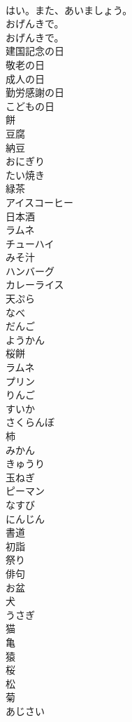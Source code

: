\documentclass[8pt]{extreport}
\begin{document}
\begin{CJK}{UTF8}{min}
\\	はい。また、あいましょう。 
\\	おげんきで。	
\\	おげんきで。 
\\	建国記念の日
\\	敬老の日
\\	成人の日
\\	勤労感謝の日
\\	こどもの日
\\	餅
\\	豆腐
\\	納豆
\\	おにぎり
\\	たい焼き
\\	緑茶
\\	アイスコーヒー
\\	日本酒
\\	ラムネ
\\	チューハイ
\\	みそ汁
\\	ハンバーグ
\\	カレーライス
\\	天ぷら
\\	なべ
\\	だんご
\\	ようかん
\\	桜餅
\\	ラムネ
\\	プリン
\\	りんご
\\	すいか
\\	さくらんぼ
\\	柿
\\	みかん
\\	きゅうり
\\	玉ねぎ
\\	ピーマン
\\	なすび
\\	にんじん
\\	書道
\\	初詣
\\	祭り
\\	俳句
\\	お盆
\\	犬
\\	うさぎ
\\	猫
\\	亀
\\	猿
\\	桜
\\	松
\\	菊
\\	あじさい

\end{CJK}
\end{document}
